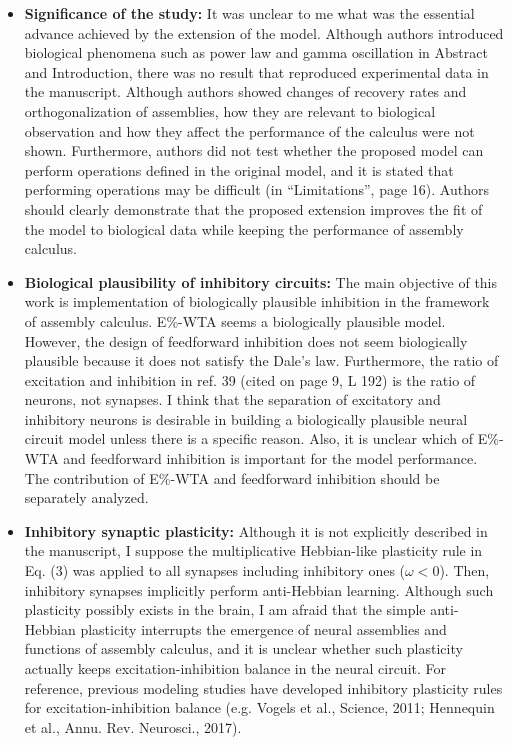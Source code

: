 \documentclass[a4paper, 11pt]{article}
\begin{document}
\begin{itemize}
    \item \textbf{Significance of the study:} It was unclear to me what was the essential advance achieved by the extension of the model. Although authors introduced biological phenomena such as power law and gamma oscillation in Abstract and Introduction, there was no result that reproduced experimental data in the manuscript. Although authors showed changes of recovery rates and orthogonalization of assemblies, how they are relevant to biological observation and how they affect the performance of the calculus were not shown. Furthermore, authors did not test whether the proposed model can perform operations defined in the original model, and it is stated that performing operations may be difficult (in ``Limitations'', page 16). Authors should clearly demonstrate that the proposed extension improves the fit of the model to biological data while keeping the performance of assembly calculus.
    
    \item \textbf{Biological plausibility of inhibitory circuits:} The main objective of this work is implementation of biologically plausible inhibition in the framework of assembly calculus. E\%-WTA seems a biologically plausible model. However, the design of feedforward inhibition does not seem biologically plausible because it does not satisfy the Dale's law. Furthermore, the ratio of excitation and inhibition in ref. 39 (cited on page 9, L 192) is the ratio of neurons, not synapses. I think that the separation of excitatory and inhibitory neurons is desirable in building a biologically plausible neural circuit model unless there is a specific reason. Also, it is unclear which of E\%-WTA and feedforward inhibition is important for the model performance. The contribution of E\%-WTA and feedforward inhibition should be separately analyzed.
    
    \item \textbf{Inhibitory synaptic plasticity:} Although it is not explicitly described in the manuscript, I suppose the multiplicative Hebbian-like plasticity rule in Eq. (3) was applied to all synapses including inhibitory ones ($\omega < 0$). Then, inhibitory synapses implicitly perform anti-Hebbian learning. Although such plasticity possibly exists in the brain, I am afraid that the simple anti-Hebbian plasticity interrupts the emergence of neural assemblies and functions of assembly calculus, and it is unclear whether such plasticity actually keeps excitation-inhibition balance in the neural circuit. For reference, previous modeling studies have developed inhibitory plasticity rules for excitation-inhibition balance (e.g. Vogels et al., Science, 2011; Hennequin et al., Annu. Rev. Neurosci., 2017).
    

\end{itemize}
\end{document}
